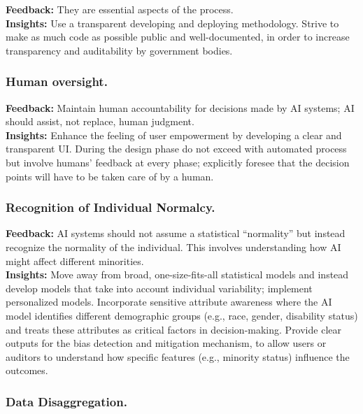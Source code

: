 \documentclass[12pt,a4paper,openright,twoside]{book}
\begin{document}
\textbf{Feedback:} They are essential aspects of the process.
\\
\textbf{Insights:} Use a transparent developing and deploying methodology.
%
Strive to make as much code as possible public and well-documented, in order to increase transparency and auditability by government bodies.


\subsubsection{Human oversight.}

\textbf{Feedback:} Maintain human accountability for decisions made by AI systems; AI should assist, not replace, human judgment.
\\
\textbf{Insights:} Enhance the feeling of user empowerment by developing a clear and transparent UI.
%
During the design phase do not exceed with automated process but involve humans' feedback at every phase; explicitly foresee that the decision points will have to be taken care of by a human.

\subsubsection{Recognition of Individual Normalcy.}

\textbf{Feedback:} AI systems should not assume a statistical ``normality'' but instead recognize the normality of the individual.
%
This involves understanding how AI might affect different minorities.
\\
\textbf{Insights:} Move away from broad, one-size-fits-all statistical models and instead develop models that take into account individual variability; implement personalized models.
%
Incorporate sensitive attribute awareness where the AI model identifies different demographic groups (e.g., race, gender, disability status) and treats these attributes as critical factors in decision-making.
%
Provide clear outputs for the bias detection and mitigation mechanism, to allow users or auditors to understand how specific features (e.g., minority status) influence the outcomes.

\subsubsection{Data Disaggregation.}
\end{document}
